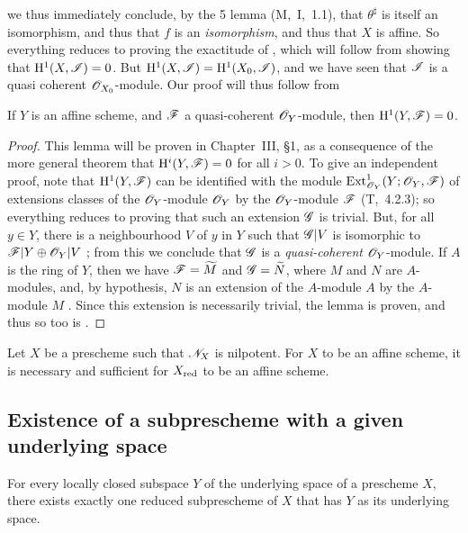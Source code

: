 we thus immediately conclude, by the 5 lemma (M,~I,~1.1), that $\theta^\sharp$ is itself an isomorphism, and thus that $f$ is an \emph{isomorphism}, and thus that $X$ is affine.
So everything reduces to proving the exactitude of , which will follow from showing that $\mathrm{H}^1(X,\mathscr{I})=0$.
But $\mathrm{H}^1(X,\mathscr{I})=\mathrm{H}^1(X_0,\mathscr{I})$, and we have seen that $\mathscr{I}$ is a quasi coherent $\mathscr{O}_{X_0}$-module.
Our proof will thus follow from
\begin{lemma}[5.1.9.2]
\label{I.5.1.9.2}
If $Y$ is an affine scheme, and $\mathscr{F}$ a quasi-coherent $\mathscr{O}_Y$-module, then $\mathrm{H}^1(Y,\mathscr{F})=0$.
\end{lemma}

\begin{proof}
This lemma will be proven in Chapter~III, §1, as a consequence of the more general theorem that $\mathrm{H}^i(Y,\mathscr{F})=0$ for all $i>0$.
To give an independent proof, note that $\mathrm{H}^1(Y,\mathscr{F})$ can be identified with the module $\operatorname{Ext}_{\mathscr{O}_Y}^1(Y;\mathscr{O}_Y,\mathscr{F})$ of extensions classes of the $\mathscr{O}_Y$-module $\mathscr{O}_Y$ by the $\mathscr{O}_Y$-module $\mathscr{F}$ (T,~4.2.3);
so everything reduces to proving that such an extension $\mathscr{G}$ is trivial.
But, for all $y\in Y$, there is a neighbourhood $V$ of $y$ in $Y$ such that $\mathscr{G}|V$ is isomorphic to $\mathscr{F}|Y\oplus\mathscr{O}_Y|V$ ;
from this we conclude that $\mathscr{G}$ is a \emph{quasi-coherent} $\mathscr{O}_Y$-module.
If $A$ is the ring of $Y$, then we have $\mathscr{F}=\widetilde{M}$ and $\mathscr{G}=\widetilde{N}$, where $M$ and $N$ are $A$-modules, and, by hypothesis, $N$ is an extension of the $A$-module $A$ by the $A$-module $M$ .
Since this extension is necessarily trivial, the lemma is proven, and thus so too is .
\end{proof}

\begin{corollary}[5.1.10]
\label{I.5.1.10}
Let $X$ be a prescheme such that $\mathscr{N}_X$ is nilpotent.
For $X$ to be an affine scheme, it is necessary and sufficient for $X_{\mathrm{red}}$ to be an affine scheme.
\end{corollary}

\subsection{Existence of a subprescheme with a given underlying space}
\label{subsection:I.5.2}

\begin{proposition}[5.2.1]
\label{I.5.2.1}
For every locally closed subspace $Y$ of the underlying space of a prescheme $X$, there exists exactly one reduced subprescheme of $X$ that has $Y$ as its underlying space.
\end{proposition}

